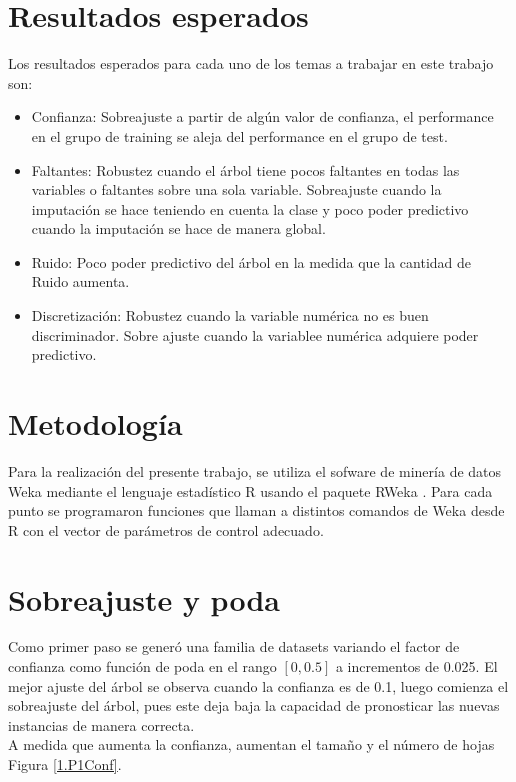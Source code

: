 \documentclass[]{article}
\begin{document}
\section*{Resultados esperados}
Los resultados esperados para cada uno de los temas a trabajar en este trabajo son:
\begin{itemize}
	\item Confianza: Sobreajuste a partir de algún valor de confianza, el performance en el grupo de training se aleja del performance en el grupo de test.
	\item Faltantes: Robustez cuando el árbol tiene pocos faltantes en todas las variables o faltantes sobre una sola variable. Sobreajuste cuando la imputación se hace teniendo en cuenta la clase y poco poder predictivo cuando la imputación se hace de manera global.
	\item Ruido: Poco poder predictivo del árbol en la medida que la cantidad de Ruido aumenta.
	\item Discretización: Robustez cuando la variable numérica no es buen discriminador. Sobre ajuste cuando la variablee numérica adquiere poder predictivo.
\end{itemize}

\section*{Metodología}
Para la realización del presente trabajo, se utiliza el sofware de minería de datos Weka \cite{Weka1} mediante el lenguaje estadístico R \cite{RCran} usando el paquete RWeka \cite{RWeka}. Para cada punto se programaron funciones que llaman a distintos comandos de Weka desde R con el vector de parámetros de control adecuado.



\section{Sobreajuste y poda}
Como primer paso se generó una familia de datasets variando el factor de confianza como función de poda en el rango $[0,0.5]$ a incrementos de 0.025. El mejor ajuste del árbol se observa cuando la confianza es de 0.1, luego comienza el sobreajuste del árbol, pues este deja baja la capacidad de pronosticar las nuevas instancias de manera correcta.\\
A medida que aumenta la confianza, aumentan el tamaño y el número de hojas Figura \ref{1.P1Conf}.


\end{document}
